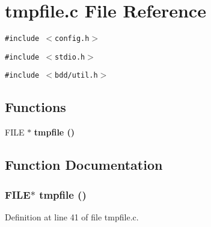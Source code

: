 \section{tmpfile.c File Reference}
\label{tmpfile_8c}
{\tt \#include $<$config.h$>$}\par
{\tt \#include $<$stdio.h$>$}\par
{\tt \#include $<$bdd/util.h$>$}\par
\subsection*{Functions}
\begin{CompactItemize}
\item 
FILE $\ast$ \bf{tmpfile} ()
\end{CompactItemize}


\subsection{Function Documentation}
\subsubsection{\setlength{\rightskip}{0pt plus 5cm}FILE$\ast$ tmpfile ()}\label{tmpfile_8c_aa27410e92f4f2e191e01e55e1811155}




Definition at line 41 of file tmpfile.c.